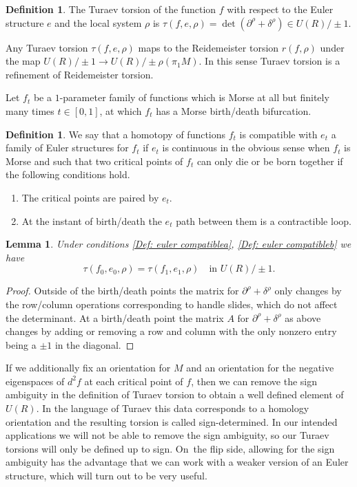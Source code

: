 \documentclass[11pt]{article}
\numberwithin{equation}{section}\providecommand{\dpl}{\displaystyle}
\newenvironment{enumeratea}
{\bgroup\def\theenumi{\alph{enumi}}\begin{enumerate}}
{\end{enumerate}\egroup}
\theoremstyle{plain}
\newtheorem{lemma}[theorem]{Lemma}
\theoremstyle{definition}
\newtheorem{definition}[theorem]{Definition}
\begin{document}
\begin{definition}
The Turaev torsion of the function $f$ with respect to the Euler structure $e$ and the local system $\rho$ is $\tau( f,e, \rho)=\det(\partial^\rho + \delta^\rho) \in U(R) / \pm 1$.
\end{definition}

Any Turaev torsion $\tau(f, e, \rho)$ maps to the Reidemeister torsion $r(f, \rho)$ under the map $U(R) / \pm 1 \to U(R) / \pm \rho( \pi_1M)$. In this sense Turaev torsion is a refinement of Reidemeister torsion.

Let $f_t$ be a $1$-parameter family of functions which is Morse at all but finitely many times $t \in [0,1]$, at which $f_t$ has a Morse birth/death bifurcation.

\begin{definition}\label{Def: euler compatible} We say that a homotopy of functions $f_t$ is compatible with $e_t$ a family of Euler structures for $f_t$ if $e_t$ is continuous in the obvious sense when $f_t$ is Morse and such that two critical points of $f_t$ can only die or be born together if the following conditions hold.
\begin{enumeratea}
\item\label{Def: euler compatiblea}
The critical points are paired by $e_t$.
\item\label{Def: euler compatibleb}
At the instant of birth/death the $e_t$ path between them is a contractible loop.
\end{enumeratea}
\end{definition}

\begin{lemma}\label{inv}
Under conditions \eqref{Def: euler compatiblea}, \eqref{Def: euler compatibleb} we have
\[
\tau(f_0,e_0, \rho)=\tau(f_1,e_1, \rho)\quad\text{in }U(R) / \pm1.
\]
\end{lemma}

\begin{proof}
Outside of the birth/death points the matrix for $\partial^\rho + \delta^\rho$ only changes by the row/column operations corresponding to handle slides, which do not affect the determinant. At a birth/death point the matrix $A$ for $\partial^\rho + \delta^\rho$ as above changes by adding or removing a row and column with the only nonzero entry being a $\pm 1$ in the diagonal. \end{proof}

If we additionally fix an orientation for $M$ and an orientation for the negative eigenspaces of $d^2f$ at each critical point of $f$, then we can remove the sign ambiguity in the definition of Turaev torsion to obtain a well defined element of $ U(R)$. In the language of Turaev this data corresponds to a homology orientation and the resulting torsion is called sign-determined. In our intended applications we will not be able to remove the sign ambiguity, so our Turaev torsions will only be defined up to sign. On~the flip side, allowing for the sign ambiguity has the advantage that we can work with a weaker version of an Euler structure, which will turn out to be very useful.
\end{document}
